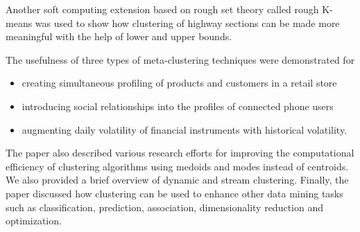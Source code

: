 \documentclass[oribibl]{llncs}
\begin{document}
Another soft computing extension based on rough set theory called rough K-means was used to show how clustering of highway sections can be made more meaningful with the help of lower and upper bounds.

The usefulness of three types of meta-clustering techniques were demonstrated for
\begin{itemize}
\item creating simultaneous profiling of products and customers in a retail store
\item introducing social relationships into the profiles of connected phone users
\item augmenting daily volatility of financial instruments with historical volatility.
\end{itemize}

The paper also described various research efforts for improving the computational efficiency of clustering algorithms using medoids and modes instead of centroids. We also provided a brief overview of dynamic and stream clustering. Finally, the paper discussed how clustering can be used to enhance other data mining tasks such as classification, prediction, association, dimensionality reduction and optimization.

%


\end{document}
